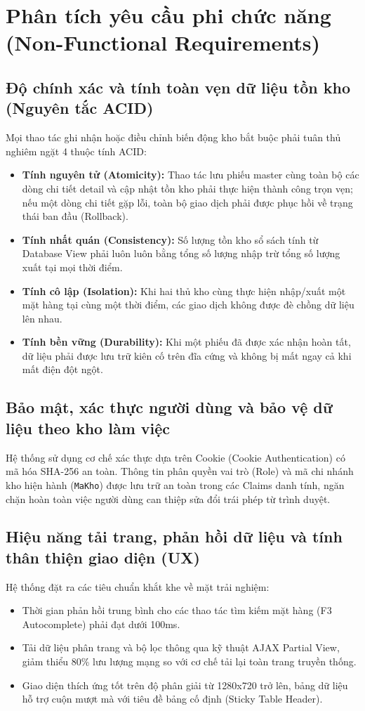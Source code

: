 \documentclass[12pt,a4paper]{report}
\renewcommand{\_}{\textunderscore\allowbreak}
\begin{document}
\section{Phân tích yêu cầu phi chức năng (Non-Functional Requirements)}

\subsection{Độ chính xác và tính toàn vẹn dữ liệu tồn kho (Nguyên tắc ACID)}
Mọi thao tác ghi nhận hoặc điều chỉnh biến động kho bắt buộc phải tuân thủ nghiêm ngặt 4 thuộc tính ACID:
\begin{itemize}
    \item \textbf{Tính nguyên tử (Atomicity):} Thao tác lưu phiếu master cùng toàn bộ các dòng chi tiết detail và cập nhật tồn kho phải thực hiện thành công trọn vẹn; nếu một dòng chi tiết gặp lỗi, toàn bộ giao dịch phải được phục hồi về trạng thái ban đầu (Rollback).
    \item \textbf{Tính nhất quán (Consistency):} Số lượng tồn kho sổ sách tính từ Database View phải luôn luôn bằng tổng số lượng nhập trừ tổng số lượng xuất tại mọi thời điểm.
    \item \textbf{Tính cô lập (Isolation):} Khi hai thủ kho cùng thực hiện nhập/xuất một mặt hàng tại cùng một thời điểm, các giao dịch không được đè chồng dữ liệu lên nhau.
    \item \textbf{Tính bền vững (Durability):} Khi một phiếu đã được xác nhận hoàn tất, dữ liệu phải được lưu trữ kiên cố trên đĩa cứng và không bị mất ngay cả khi mất điện đột ngột.
\end{itemize}

\subsection{Bảo mật, xác thực người dùng và bảo vệ dữ liệu theo kho làm việc}
Hệ thống sử dụng cơ chế xác thực dựa trên Cookie (Cookie Authentication) có mã hóa SHA-256 an toàn. Thông tin phân quyền vai trò (Role) và mã chi nhánh kho hiện hành (\texttt{MaKho}) được lưu trữ an toàn trong các Claims danh tính, ngăn chặn hoàn toàn việc người dùng can thiệp sửa đổi trái phép từ trình duyệt.

\subsection{Hiệu năng tải trang, phản hồi dữ liệu và tính thân thiện giao diện (UX)}
Hệ thống đặt ra các tiêu chuẩn khắt khe về mặt trải nghiệm:
\begin{itemize}
    \item Thời gian phản hồi trung bình cho các thao tác tìm kiếm mặt hàng (F3 Autocomplete) phải đạt dưới 100ms.
    \item Tải dữ liệu phân trang và bộ lọc thông qua kỹ thuật AJAX Partial View, giảm thiểu 80\% lưu lượng mạng so với cơ chế tải lại toàn trang truyền thống.
    \item Giao diện thích ứng tốt trên độ phân giải từ 1280x720 trở lên, bảng dữ liệu hỗ trợ cuộn mượt mà với tiêu đề bảng cố định (Sticky Table Header).
\end{itemize}
\end{document}
